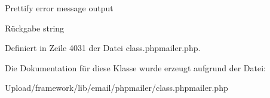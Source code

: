 Prettify error message output \begin{DoxyReturn}{Rückgabe}
string 
\end{DoxyReturn}


Definiert in Zeile 4031 der Datei class.\+phpmailer.\+php.



Die Dokumentation für diese Klasse wurde erzeugt aufgrund der Datei\+:\begin{DoxyCompactItemize}
\item 
Upload/framework/lib/email/phpmailer/class.\+phpmailer.\+php\end{DoxyCompactItemize}
